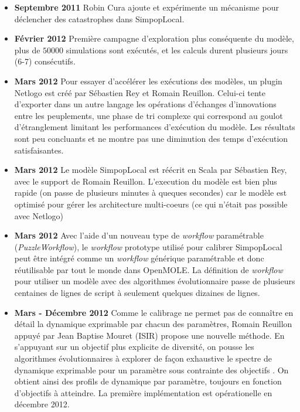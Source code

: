 \begin{itemize}[label=\textbullet]
\item {\textbf{Septembre 2011}} Robin Cura ajoute et expérimente un mécanisme pour déclencher des catastrophes dans SimpopLocal.

\item {\textbf{Février 2012}} Première campagne d'exploration plus conséquente du modèle, plus de $\num{50000}$ simulations sont exécutés, et les calculs durent plusieurs jours (6-7) consécutifs.

\item {\textbf{Mars 2012}} Pour essayer d'accélérer les exécutions des modèles, un plugin Netlogo est créé par Sébastien Rey et Romain Reuillon. Celui-ci tente d'exporter dans un autre langage les opérations d'échanges d'innovations entre les peuplements, une phase de tri complexe qui correspond au goulot d'étranglement limitant les performances d'exécution du modèle. Les résultats sont peu concluants et ne montre pas une diminution des temps d'exécution satisfaisantes.

\item {\textbf{Mars 2012}} Le modèle SimpopLocal est réécrit en Scala par Sébastien Rey, avec le support de Romain Reuillon. L'execution du modèle est bien plus rapide (on passe de plusieurs minutes à queques secondes) car le modèle est optimisé pour gérer les architecture multi-coeurs (ce qui n'était pas possible avec Netlogo)

\item {\textbf{Mars 2012}} Avec l'aide d'un nouveau type de \textit{workflow} paramétrable (\textit{PuzzleWorkflow}), le \textit{workflow} prototype utilisé pour calibrer SimpopLocal peut être intégré comme un \textit{workflow} générique paramétrable et donc réutilisable par tout le monde dans OpenMOLE. La définition de \textit{workflow} pour utiliser un modèle avec des algorithmes évolutionnaire passe de plusieurs centaines de lignes de script à seulement quelques dizaines de lignes. 

\item {\textbf{Mars - Décembre 2012}} Comme le calibrage ne permet pas de connaître en détail la dynamique exprimable par chacun des paramètres, Romain Reuillon appuyé par Jean Baptise Mouret (ISIR) propose une nouvelle méthode. En s'appuyant sur un objectif plus explicite de diversité, on pousse les algorithmes évolutionnaires à explorer de façon exhaustive le spectre de dynamique exprimable pour un paramètre sous contrainte des objectifs \autocite{Reuillon2015}. On obtient ainsi des profils de dynamique par paramètre, toujours en fonction d'objectifs à atteindre. La première implémentation est opérationelle en décembre 2012.


\end{itemize}
